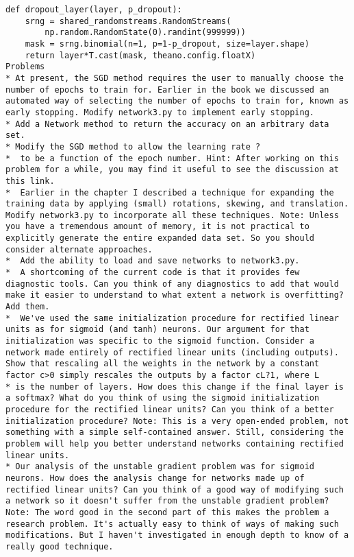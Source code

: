 \begin{lstlisting}
def dropout_layer(layer, p_dropout):
    srng = shared_randomstreams.RandomStreams(
        np.random.RandomState(0).randint(999999))
    mask = srng.binomial(n=1, p=1-p_dropout, size=layer.shape)
    return layer*T.cast(mask, theano.config.floatX)
Problems
* At present, the SGD method requires the user to manually choose the number of epochs to train for. Earlier in the book we discussed an automated way of selecting the number of epochs to train for, known as early stopping. Modify network3.py to implement early stopping.
* Add a Network method to return the accuracy on an arbitrary data set.
* Modify the SGD method to allow the learning rate ?
*  to be a function of the epoch number. Hint: After working on this problem for a while, you may find it useful to see the discussion at this link.
*  Earlier in the chapter I described a technique for expanding the training data by applying (small) rotations, skewing, and translation. Modify network3.py to incorporate all these techniques. Note: Unless you have a tremendous amount of memory, it is not practical to explicitly generate the entire expanded data set. So you should consider alternate approaches.
*  Add the ability to load and save networks to network3.py.
*  A shortcoming of the current code is that it provides few diagnostic tools. Can you think of any diagnostics to add that would make it easier to understand to what extent a network is overfitting? Add them.
*  We've used the same initialization procedure for rectified linear units as for sigmoid (and tanh) neurons. Our argument for that initialization was specific to the sigmoid function. Consider a network made entirely of rectified linear units (including outputs). Show that rescaling all the weights in the network by a constant factor c>0 simply rescales the outputs by a factor cL?1, where L
* is the number of layers. How does this change if the final layer is a softmax? What do you think of using the sigmoid initialization procedure for the rectified linear units? Can you think of a better initialization procedure? Note: This is a very open-ended problem, not something with a simple self-contained answer. Still, considering the problem will help you better understand networks containing rectified linear units.
* Our analysis of the unstable gradient problem was for sigmoid neurons. How does the analysis change for networks made up of rectified linear units? Can you think of a good way of modifying such a network so it doesn't suffer from the unstable gradient problem? Note: The word good in the second part of this makes the problem a research problem. It's actually easy to think of ways of making such modifications. But I haven't investigated in enough depth to know of a really good technique. 

\end{lstlisting}
